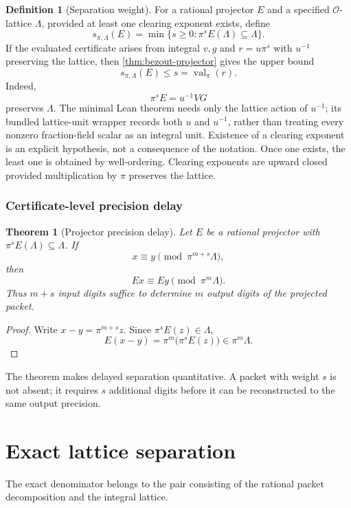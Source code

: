 \documentclass[11pt,a4paper]{article}
\newtheorem{theorem}{Theorem}[section]
\theoremstyle{definition}
\newtheorem{definition}[definition]{Definition}
\theoremstyle{remark}
\newcommand{\OO}{\mathcal O}
\newcommand{\val}{\operatorname{val}}
\providecommand{\OO}{\mathcal O}
\providecommand{\val}{\operatorname{val}}
\theoremstyle{definition}\newtheorem{construction}[theorem]{Construction}\newtheorem{certificate}[theorem]{Numerical Certificate}
\theoremstyle{remark}\newtheorem{boundary}[theorem]{Boundary}
\begin{document}
\begin{definition}[Separation weight]\label{def:separation-weight}
For a rational projector $E$ and a specified $\OO$-lattice $\Lambda$, provided
at least one clearing exponent exists, define
\[
s_{\pi,\Lambda}(E)
=
\min\{s\ge0:\pi^sE(\Lambda)\subseteq\Lambda\}.
\]
If the evaluated certificate arises from integral $v,g$ and
$r=u\pi^s$ with $u^{-1}$ preserving the lattice, then
\cref{thm:bezout-projector} gives the upper bound
\[
s_{\pi,\Lambda}(E)\le s=\val_\pi(r).
\]
Indeed,
\[
\boxed{\pi^sE=u^{-1}VG}
\]
preserves $\Lambda$. The minimal Lean theorem needs only the lattice action of
$u^{-1}$; its bundled lattice-unit wrapper records both $u$ and $u^{-1}$,
rather than treating every nonzero fraction-field scalar as an integral unit.
Existence of a clearing exponent is an explicit hypothesis, not a consequence
of the notation. Once one exists, the least one is obtained by well-ordering.
Clearing exponents are upward closed provided multiplication by $\pi$
preserves the lattice.
\end{definition}

\subsubsection{Certificate-level precision delay}

\begin{theorem}[Projector precision delay]\label{thm:precision-delay}
Let $E$ be a rational projector with $\pi^sE(\Lambda)\subseteq\Lambda$. If
\[
x\equiv y\pmod{\pi^{m+s}\Lambda},
\]
then
\[
Ex\equiv Ey\pmod{\pi^m\Lambda}.
\]
Thus $m+s$ input digits suffice to determine $m$ output digits of the projected packet.
\end{theorem}

\begin{proof}
Write $x-y=\pi^{m+s}z$. Since $\pi^sE(z)\in\Lambda$,
\[
E(x-y)=\pi^m\bigl(\pi^sE(z)\bigr)\in\pi^m\Lambda.
\]
\end{proof}

The theorem makes delayed separation quantitative. A packet with weight $s$ is not absent; it requires $s$ additional digits before it can be reconstructed to the same output precision.


\section{Exact lattice separation}\label{sec:lattice}

The exact denominator belongs to the pair consisting of the rational packet decomposition and the integral lattice.
\end{document}
